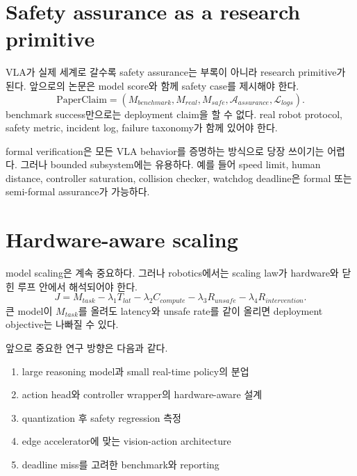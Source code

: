 \section{Safety assurance as a research primitive}

VLA가 실제 세계로 갈수록 safety assurance는 부록이 아니라 research primitive가 된다. 앞으로의 논문은 model score와 함께 safety case를 제시해야 한다.
\begin{equation}
  \mathrm{PaperClaim}
  =
  (
  M_{benchmark},
  M_{real},
  M_{safe},
  \mathcal{A}_{assurance},
  \mathcal{L}_{logs}
  ).
  \label{eq:ch22-paper-claim}
\end{equation}
benchmark success만으로는 deployment claim을 할 수 없다. real robot protocol, safety metric, incident log, failure taxonomy가 함께 있어야 한다.

formal verification은 모든 VLA behavior를 증명하는 방식으로 당장 쓰이기는 어렵다. 그러나 bounded subsystem에는 유용하다. 예를 들어 speed limit, human distance, controller saturation, collision checker, watchdog deadline은 formal 또는 semi-formal assurance가 가능하다.

\section{Hardware-aware scaling}

model scaling은 계속 중요하다. 그러나 robotics에서는 scaling law가 hardware와 닫힌 루프 안에서 해석되어야 한다.
\begin{equation}
  J
  =
  M_{task}
  -
  \lambda_1 T_{lat}
  -
  \lambda_2 C_{compute}
  -
  \lambda_3 R_{unsafe}
  -
  \lambda_4 R_{intervention}.
  \label{eq:ch22-deployment-objective}
\end{equation}
큰 model이 $M_{task}$를 올려도 latency와 unsafe rate를 같이 올리면 deployment objective는 나빠질 수 있다.

앞으로 중요한 연구 방향은 다음과 같다.
\begin{enumerate}
  \item large reasoning model과 small real-time policy의 분업
  \item action head와 controller wrapper의 hardware-aware 설계
  \item quantization 후 safety regression 측정
  \item edge accelerator에 맞는 vision-action architecture
  \item deadline miss를 고려한 benchmark와 reporting
\end{enumerate}

